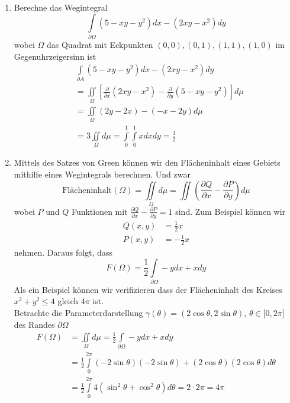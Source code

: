 \begin{enumerate}
\item Berechne das Wegintegral \[\int\limits_{\partial \Omega } {\left( {5 - xy - {y^2}} \right)dx - \left( {2xy - {x^2}} \right)dy} \] wobei $\Omega$ das Quadrat mit Eckpunkten $(0,0),(0,1),(1,1),(1,0)$ im Gegenuhrzeigersinn ist
\begin{align*}
&\int\limits_{\partial A} {\left( {5 - xy - {y^2}} \right)dx - \left( {2xy - {x^2}} \right)dy} \\
&=\iint\limits_\Omega\left[ {\frac{\partial }{{\partial x}}\left( {2xy - {x^2}} \right) - \frac{\partial }{{\partial y}}\left( {5 - xy - {y^2}} \right)} \right]d\mu \\
&=\iint\limits_\Omega\left(  2y-2x\right) - \left( -x-2y\right) d\mu\\
&=3\iint\limits_\Omega d\mu=\int\limits_0^1\int\limits_0^1 x dx dy=\frac{3}{2}
\end{align*}
\item Mittels des Satzes von Green können wir den Flächeninhalt eines Gebiets mithilfe eines Wegintegrals berechnen. Und zwar
\[ \text{Flächeninhalt$\left( \Omega\right)$}=\iint\limits_\Omega d\mu=\iint\left( \frac{\partial Q}{\partial x}-\frac{\partial P}{\partial y}\right) d\mu\]
wobei $P$ und $Q$ Funktionen mit $\frac{\partial Q}{\partial x}-\frac{\partial P}{\partial y}=1$ sind. Zum Beispiel können wir
\begin{align*}
Q\left( x,y\right)&=\frac{1}{2}x\\
P\left( x,y\right)&=-\frac{1}{2}x
\end{align*}
nehmen. Daraus folgt, dass \[ F\left( \Omega\right) = \frac{1}{2}\int\limits_{\partial\Omega}-y dx+xdy\]
Als ein Beispiel können wir verifizieren dass der Flächeninhalt des Kreises $x^2+y^2\leq 4$ gleich $4\pi$ ist. \\

Betrachte die Parameterdarstellung $\gamma\left(\theta\right)=\left( 2\cos\theta,2\sin\theta\right)$, $\theta\in\lbrack 0,2\pi\rbrack$ des Randes $\partial\Omega$
\begin{align*}
F\left(\Omega\right)&=\iint\limits_\Omega d\mu = \frac{1}{2}\int\limits_{\partial\Omega} -ydx+xdy\\
&=\frac{1}{2}\int\limits_0^{2\pi}\left( -2\sin\theta\right)\left( -2\sin\theta\right) + \left( 2\cos\theta\right)\left( 2\cos\theta\right) d\theta\\
&=\frac{1}{2}\int\limits_0^{2\pi}4\left( \sin^2\theta+\cos^2\theta\right)d\theta=2\cdot 2\pi=4\pi
\end{align*}
\end{enumerate}
